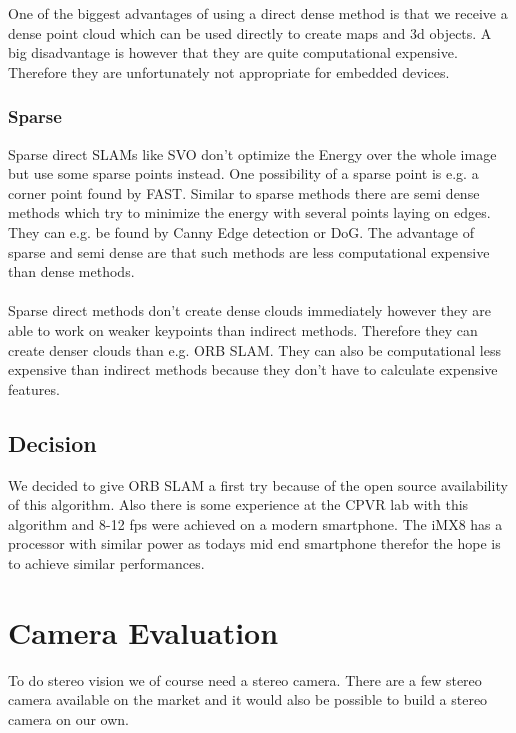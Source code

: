 \documentclass[11pt,a4paper,titlepage,oneside]{report}
\begin{document}
One of the biggest advantages of using a direct dense method is that we receive a dense point cloud which can be used directly to create maps and 3d objects. A big disadvantage is however that they are quite computational expensive. Therefore they are unfortunately not appropriate for embedded devices.

\subsection{Sparse}

Sparse direct SLAMs like SVO don't optimize the Energy over the whole image but use some sparse points instead. One possibility of a sparse point is e.g. a corner point found by FAST. Similar to sparse methods there are semi dense methods which try to minimize the energy with several points laying on edges. They can e.g. be found by Canny Edge detection or DoG. The advantage of sparse and semi dense are that such methods are less computational expensive than dense methods.\\\\

Sparse direct methods don't create dense clouds immediately however they are able to work on weaker keypoints than indirect methods. Therefore they can create denser clouds than e.g. ORB SLAM. They can also be computational less expensive than indirect methods because they don't have to calculate expensive features.

\section{Decision}

We decided to give ORB SLAM a first try because of the open source availability of this algorithm. Also there is some experience at the CPVR lab with this algorithm and 8-12 fps were achieved on a modern smartphone. The iMX8 has a processor with similar power as todays mid end smartphone therefor the hope is to achieve similar performances.

\chapter{Camera Evaluation}

To do stereo vision we of course need a stereo camera. There are a few stereo camera available on the market and it would also be possible to build a stereo camera on our own.
\end{document}
